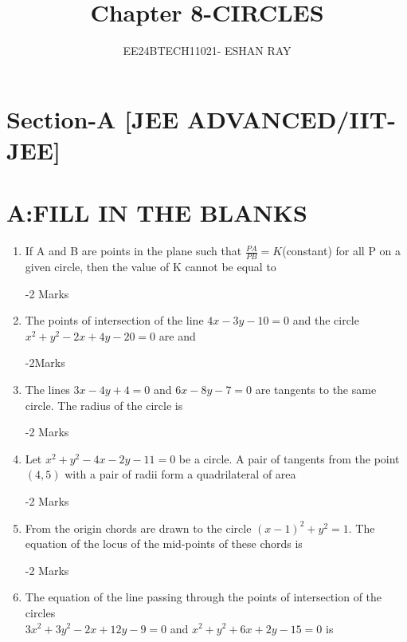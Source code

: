 \documentclass[journal,12pt,twocolumn]{IEEEtran}
\begin{document}
\title{Chapter 8-CIRCLES}
\author{EE24BTECH11021- ESHAN RAY}
\maketitle
\newpage
\bigskip
\section*{Section-A [JEE ADVANCED/IIT-JEE]}
\section*{A:FILL IN THE BLANKS}
\begin{enumerate}
    

	\item If A and B are points in the plane such that        $\frac{PA}{PB}=K$(constant) for all P on a given circle, then the value of K cannot be equal to \dotuline{\hspace{3cm}}

\hfill{-2 Marks} 
\item The points of intersection of the line $4x-3y-10=0$ and the circle $x^{2}+y^{2}-2x+4y-20=0$ are \dotuline{\hspace{3cm}} and \dotuline{\hspace{3cm}}   

\hfill{-2Marks}
\item The lines $3x-4y+4=0$ and $6x-8y-7=0$ are tangents to the same circle. The radius of the circle is \dotuline{\hspace{3cm}} 

\hfill{-2 Marks}
\item Let $x^{2}+y^{2}-4x-2y-11=0$ be a circle. A pair of tangents from the point $(4,5)$ with a pair of radii form a quadrilateral of area \dotuline{\hspace{3cm}} 

\hfill{-2 Marks}
\item From the origin chords are drawn  to the circle $(x-1)^{2}+y^{2}=1$. The equation of the locus of the mid-points of these chords is \dotuline{\hspace{3cm}}

\hfill{-2 Marks}
\item The equation of the line passing through the points of intersection of the circles\\ $3x^{2}+3y^{2}-2x+12y-9=0$ and $x^{2}+y^{2}+6x+2y-15=0$ is \dotuline{\hspace{3cm}}


\end{enumerate}
\end{document}
